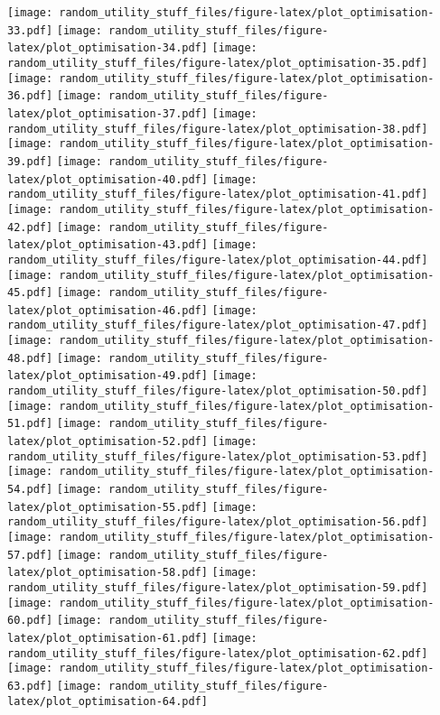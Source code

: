 \documentclass[]{article}
\begin{document}
\texttt{[image: random\_utility\_stuff\_files/figure-latex/plot\_optimisation-33.pdf]}
\texttt{[image: random\_utility\_stuff\_files/figure-latex/plot\_optimisation-34.pdf]}
\texttt{[image: random\_utility\_stuff\_files/figure-latex/plot\_optimisation-35.pdf]}
\texttt{[image: random\_utility\_stuff\_files/figure-latex/plot\_optimisation-36.pdf]}
\texttt{[image: random\_utility\_stuff\_files/figure-latex/plot\_optimisation-37.pdf]}
\texttt{[image: random\_utility\_stuff\_files/figure-latex/plot\_optimisation-38.pdf]}
\texttt{[image: random\_utility\_stuff\_files/figure-latex/plot\_optimisation-39.pdf]}
\texttt{[image: random\_utility\_stuff\_files/figure-latex/plot\_optimisation-40.pdf]}
\texttt{[image: random\_utility\_stuff\_files/figure-latex/plot\_optimisation-41.pdf]}
\texttt{[image: random\_utility\_stuff\_files/figure-latex/plot\_optimisation-42.pdf]}
\texttt{[image: random\_utility\_stuff\_files/figure-latex/plot\_optimisation-43.pdf]}
\texttt{[image: random\_utility\_stuff\_files/figure-latex/plot\_optimisation-44.pdf]}
\texttt{[image: random\_utility\_stuff\_files/figure-latex/plot\_optimisation-45.pdf]}
\texttt{[image: random\_utility\_stuff\_files/figure-latex/plot\_optimisation-46.pdf]}
\texttt{[image: random\_utility\_stuff\_files/figure-latex/plot\_optimisation-47.pdf]}
\texttt{[image: random\_utility\_stuff\_files/figure-latex/plot\_optimisation-48.pdf]}
\texttt{[image: random\_utility\_stuff\_files/figure-latex/plot\_optimisation-49.pdf]}
\texttt{[image: random\_utility\_stuff\_files/figure-latex/plot\_optimisation-50.pdf]}
\texttt{[image: random\_utility\_stuff\_files/figure-latex/plot\_optimisation-51.pdf]}
\texttt{[image: random\_utility\_stuff\_files/figure-latex/plot\_optimisation-52.pdf]}
\texttt{[image: random\_utility\_stuff\_files/figure-latex/plot\_optimisation-53.pdf]}
\texttt{[image: random\_utility\_stuff\_files/figure-latex/plot\_optimisation-54.pdf]}
\texttt{[image: random\_utility\_stuff\_files/figure-latex/plot\_optimisation-55.pdf]}
\texttt{[image: random\_utility\_stuff\_files/figure-latex/plot\_optimisation-56.pdf]}
\texttt{[image: random\_utility\_stuff\_files/figure-latex/plot\_optimisation-57.pdf]}
\texttt{[image: random\_utility\_stuff\_files/figure-latex/plot\_optimisation-58.pdf]}
\texttt{[image: random\_utility\_stuff\_files/figure-latex/plot\_optimisation-59.pdf]}
\texttt{[image: random\_utility\_stuff\_files/figure-latex/plot\_optimisation-60.pdf]}
\texttt{[image: random\_utility\_stuff\_files/figure-latex/plot\_optimisation-61.pdf]}
\texttt{[image: random\_utility\_stuff\_files/figure-latex/plot\_optimisation-62.pdf]}
\texttt{[image: random\_utility\_stuff\_files/figure-latex/plot\_optimisation-63.pdf]}
\texttt{[image: random\_utility\_stuff\_files/figure-latex/plot\_optimisation-64.pdf]}
\end{document}
